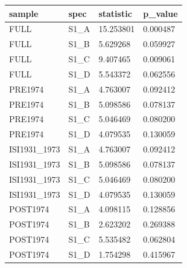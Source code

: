 \begin{tabular}{llll}
\hline
sample & spec & statistic & p\_value \\
\hline
FULL & S1\_A & 15.253801 & 0.000487 \\
FULL & S1\_B & 5.629268 & 0.059927 \\
FULL & S1\_C & 9.407465 & 0.009061 \\
FULL & S1\_D & 5.543372 & 0.062556 \\
PRE1974 & S1\_A & 4.763007 & 0.092412 \\
PRE1974 & S1\_B & 5.098586 & 0.078137 \\
PRE1974 & S1\_C & 5.046469 & 0.080200 \\
PRE1974 & S1\_D & 4.079535 & 0.130059 \\
ISI1931\_1973 & S1\_A & 4.763007 & 0.092412 \\
ISI1931\_1973 & S1\_B & 5.098586 & 0.078137 \\
ISI1931\_1973 & S1\_C & 5.046469 & 0.080200 \\
ISI1931\_1973 & S1\_D & 4.079535 & 0.130059 \\
POST1974 & S1\_A & 4.098115 & 0.128856 \\
POST1974 & S1\_B & 2.623202 & 0.269388 \\
POST1974 & S1\_C & 5.535482 & 0.062804 \\
POST1974 & S1\_D & 1.754298 & 0.415967 \\
\hline
\end{tabular}

